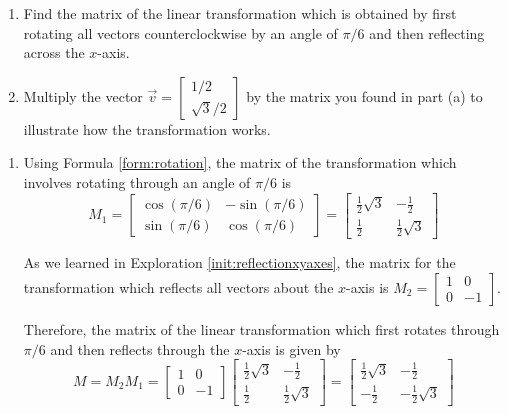 \documentclass{ximera}
\begin{document}
\begin{example}\label{exa:rotationreflection}
\begin{enumerate}
    \item Find the matrix of the linear transformation which is obtained by first rotating all vectors counterclockwise by an angle of $\pi /6$ and then reflecting across the $x$-axis.
    \item Multiply the vector $\vec{v}=\begin{bmatrix}
    1/2 \\ \sqrt{3}/2 \end{bmatrix}$ by the matrix you found in part (a) to illustrate how the transformation works.
\end{enumerate}


\begin{explanation}
\begin{enumerate}
    \item 

Using Formula \ref{form:rotation}, the matrix of the transformation which
involves rotating through an angle of $\pi /6$ is
\begin{equation*}
M_1 =
\begin{bmatrix}
\cos \left( \pi /6\right) & -\sin \left( \pi /6\right) \\
\sin \left( \pi /6\right) & \cos \left( \pi /6\right)
\end{bmatrix}
 =
\begin{bmatrix}
\frac{1}{2}\sqrt{3} & -\frac{1}{2} \\
\frac{1}{2} & \frac{1}{2}\sqrt{3}
\end{bmatrix}
\end{equation*}

As we learned in Exploration \ref{init:reflectionxyaxes}, the matrix for the transformation which reflects all vectors about the $x$-axis is $M_2 = \begin{bmatrix}1 & 0 \\ 0 & -1 \end{bmatrix}$.

Therefore, the matrix of the linear transformation which first rotates
through $\pi /6$ and then reflects through the $x$-axis is given by
\begin{equation*}
M = M_2 M_1 = 
\begin{bmatrix}1 & 0 \\ 0 & -1 \end{bmatrix} \begin{bmatrix}
\frac{1}{2}\sqrt{3} & -\frac{1}{2} \\
\frac{1}{2} & \frac{1}{2}\sqrt{3}
\end{bmatrix} = \begin{bmatrix}
\frac{1}{2}\sqrt{3} & -\frac{1}{2} \\
-\frac{1}{2} & -\frac{1}{2}\sqrt{3}
\end{bmatrix}
\end{equation*}


\end{enumerate}
\end{explanation}
\end{example}
\end{document}
